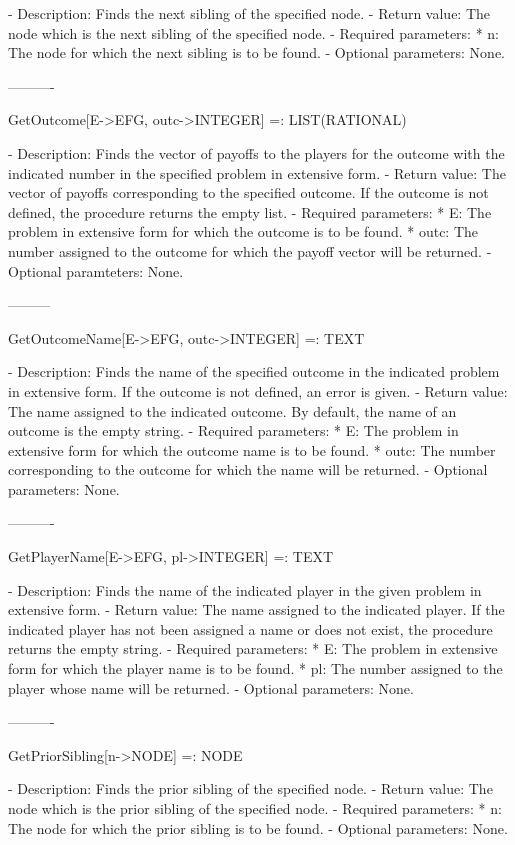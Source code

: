    -	Description:  Finds the next sibling of the specified node.
   -	Return value:  The node which is the next sibling of the specified 
	node.
   -	Required parameters:
	  *  n:  The node for which the next sibling is to be found.
   -	Optional parameters:  None.

----------

GetOutcome[E->EFG, outc->INTEGER] =: LIST(RATIONAL)

   -	Description:  Finds the vector of payoffs to the players for the 
	outcome with the indicated number in the specified problem in extensive
	form.
   -	Return value:  The vector of payoffs corresponding to the specified 
	outcome.  If the outcome is not defined, the procedure returns the 
	empty list.
   -	Required parameters:
	  *  E:  The problem in extensive form for which the outcome is to be
		found.
	  *  outc:  The number assigned to the outcome for which the payoff 
		vector will be returned.
   -	Optional paramteters:  None.

---------

GetOutcomeName[E->EFG, outc->INTEGER] =: TEXT

   -	Description:  Finds the name of the specified outcome in the indicated
	problem in extensive form.  If the outcome is not defined, an error is
	given.
   -	Return value:  The name assigned to the indicated outcome.  By default,
	the name of an outcome is the empty string.
   -	Required parameters:
	  *  E:  The problem in extensive form for which the outcome name is to
		be found.
	  *  outc:  The number corresponding to the outcome for which the name 
		will be returned.
   -	Optional parameters:  None.

----------

GetPlayerName[E->EFG, pl->INTEGER] =: TEXT

   -	Description:  Finds the name of the indicated player in the given 
	problem in extensive form.
   -	Return value:  The name assigned to the indicated player.  If the 
	indicated player has not been assigned a name or does not exist, the
	procedure returns the empty string.
   -	Required parameters:
	  *  E:  The problem in extensive form for which the player name is to
		be found.
	  *  pl:  The number assigned to the player whose name will be 
		returned.
   -	Optional parameters:  None.

----------

GetPriorSibling[n->NODE] =: NODE

   -	Description:  Finds the prior sibling of the specified node.
   -	Return value:  The node which is the prior sibling of the specified 
	node.
   -	Required parameters:
	  *  n:  The node for which the prior sibling is to be found.
   -	Optional parameters:  None.


